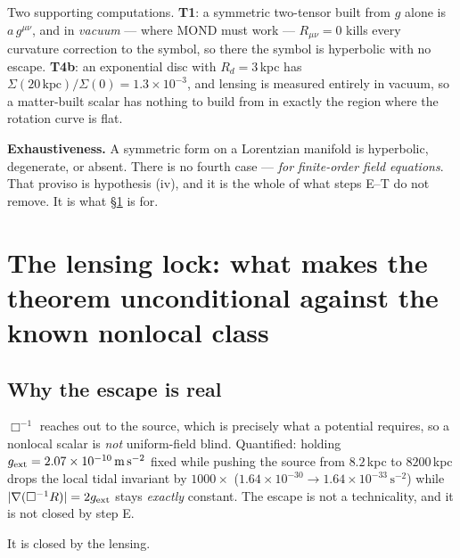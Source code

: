 \documentclass[11pt,letterpaper]{article}
\newcommand{\ms}{\,\mathrm{m\,s^{-2}}}
\newcommand{\dal}{\Box}
\begin{document}
Two supporting computations. \textbf{T1}: a symmetric two-tensor built from $g$ alone is $a\,g^{\mu\nu}$, and in \emph{vacuum} --- where MOND must work --- $R_{\mu\nu}=0$ kills every curvature correction to the symbol, so there the symbol is hyperbolic with no escape. \textbf{T4b}: an exponential disc with $R_d=3$\,kpc has $\Sigma(20\,\mathrm{kpc})/\Sigma(0)=1.3\times10^{-3}$, and lensing is measured entirely in vacuum, so a matter-built scalar has nothing to build from in exactly the region where the rotation curve is flat.

\textbf{Exhaustiveness.} A symmetric form on a Lorentzian manifold is hyperbolic, degenerate, or absent. There is no fourth case --- \emph{for finite-order field equations}. That proviso is hypothesis (iv), and it is the whole of what steps E--T do not remove. It is what \S\ref{sec:lock} is for.

\section{The lensing lock: what makes the theorem unconditional against the known nonlocal class}\label{sec:lock}

\subsection{Why the escape is real}
$\dal^{-1}$ reaches out to the source, which is precisely what a potential requires, so a nonlocal scalar is \emph{not} uniform-field blind. Quantified: holding $g_{\rm ext}=2.07\times10^{-10}\ms$ fixed while pushing the source from $8.2$\,kpc to $8200$\,kpc drops the local tidal invariant by $1000\times$ ($1.64\times10^{-30}\to1.64\times10^{-33}\,\mathrm{s^{-2}}$) while $|\nabla(\dal^{-1}R)|=2g_{\rm ext}$ stays \emph{exactly} constant. The escape is not a technicality, and it is not closed by step E.

It is closed by the lensing.
\end{document}
